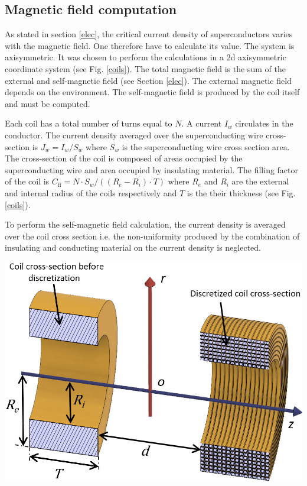 \documentclass{ws-jmrr}
\begin{document}
\begin{multicols}{2}
\subsection{Magnetic field computation}
As stated in section \ref{elec}, the critical current density of superconductors varies with the magnetic field. One therefore have to calculate its value. The system is axisymmetric. It was chosen to perform the calculations in a 2d axisymmetric coordinate system (see Fig. \ref{coils}). The total magnetic field is the sum of the external and self-magnetic field (see Section \ref{elec}). The external magnetic field depends on the environment. The self-magnetic field is produced by the coil itself and must be computed.\par
Each coil has a total number of turns equal to $N$. A current $I_w$ circulates in the conductor. The current density averaged over the superconducting wire cross-section is $J_w=I_w/S_w$ where $S_w$ is the superconducting wire cross section area. The cross-section of the coil is composed of areas occupied by the superconducting wire and area occupied by insulating material. The filling factor of the coil is $C_{\textrm{ff}}=N\cdot S_w/((R_e-R_i)\cdot T)$ where $R_e$ and $R_i$ are the external and internal radius of the coils respectively and $T$ is the their thickness (see Fig. \ref{coils}).\par
To perform the self-magnetic field calculation, the current density is averaged over the coil cross section i.e. the non-uniformity produced by the combination of insulating and conducting material on the current density is neglected.  
\begin{figurehere}
	\begin{center}
	\includegraphics[width=\linewidth]{coil_system.png}

\end{center}
\end{figurehere}
\end{multicols}
\end{document}
